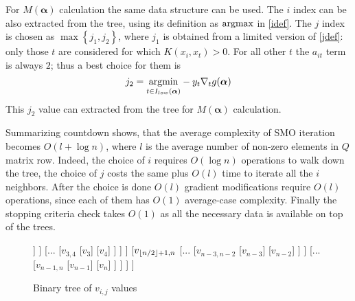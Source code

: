For $M(\bm{\alpha})$ calculation the same data structure can be used. The $i$ index can be also extracted from the tree, using its definition as $\operatorname{argmax}$ in \ref{idef}. The $j$ index is chosen as $\max\left\{j_1, j_2\right\}$, where $j_1$ is obtained 
from a limited version of \ref{jdef}: only those $t$ are considered for which $K(x_i, x_t) > 0$. For all other $t$ the $a_{it}$ term is always $2$; thus a best choice for them is
\begin{equation}
j_2 = \underset{t \in I_{low}(\bm{\alpha})}{\operatorname{argmin}} -y_t \nabla_t g(\bm{\alpha})
\end{equation}
This $j_2$ value can extracted from the tree for $M(\bm{\alpha})$ calculation.

Summarizing countdown shows, that the average complexity of SMO iteration becomes $O(l + \log n)$, where $l$ is the average number of non-zero elements in $Q$ matrix row. Indeed, the choice of $i$ requires
$O(\log n)$ operations to walk down the tree, the choice of $j$ costs the same plus $O(l)$ time to iterate all the $i$ neighbors. After the choice is done $O(l)$ gradient modifications require $O(l)$ operations, since each of them has $O(1)$ average-case complexity. Finally the stopping criteria check takes $O(1)$ as all the necessary data is available on top of the trees.

\begin{figure}
\centering
\begin{forest}
[$v_{1,n}$, 
	[$v_{1,\Floor{n/2}}$
		[...
			[$v_{1,2}$
				[$v_1$]
				[$v_2$]
			]
		]
		[...
			[$v_{3,4}$
				[$v_3$]
				[$v_4$]
			]
		]
	]
	[$v_{\lfloor n/2 \rfloor+1							,n}$
		[...
			[$v_{n-3,n-2}$
				[$v_{n-3}$]
				[$v_{n-2}$]
			]
		]
		[...
			[$v_{n-1,n}$
				[$v_{n-1}$]
				[$v_{n}$]
			]
		]
	]
]
\end{forest}
\label{vtree}
\caption{Binary tree of $v_{i,j}$ values}
\end{figure}

